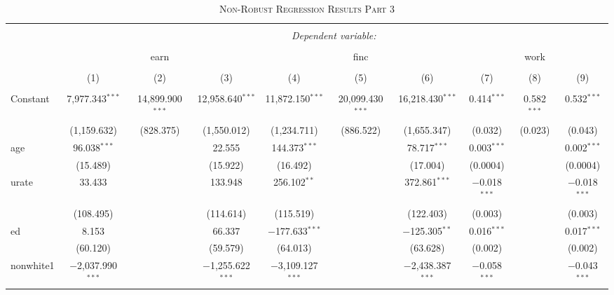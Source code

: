 \documentclass[a4paper]{article}
\begin{document}
\begin{landscape}
\begin{table}[!htbp] \centering 
\begin{adjustwidth}{1.25cm}{-0cm}
\begin{threeparttable}
\small
\captionsetup{font=small, justification=raggedright,singlelinecheck=false}
\caption{\textsc{Non-Robust Regression Results Part 3}}
\centering 
  \label{}
\small 
\begin{tabular}{@{\extracolsep{-2pt}}lccccccccc} 
\\[-5.8ex]\hline 
\hline \\[-1.8ex] 
 & \multicolumn{9}{c}{\textit{Dependent variable:}} \\ 
\cline{2-10} 
\\[-1.8ex] & \multicolumn{3}{c}{earn} & \multicolumn{3}{c}{finc} & \multicolumn{3}{c}{work} \\ 
\\[-1.8ex] & (1) & (2) & (3) & (4) & (5) & (6) & (7) & (8) & (9)\\ 
\hline \\[-1.8ex] 
 Constant & 7,977.343$^{***}$ & 14,899.900$^{***}$ & 12,958.640$^{***}$ & 11,872.150$^{***}$ & 20,099.430$^{***}$ & 16,218.430$^{***}$ & 0.414$^{***}$ & 0.582$^{***}$ & 0.532$^{***}$ \\ 
  & (1,159.632) & (828.375) & (1,550.012) & (1,234.711) & (886.522) & (1,655.347) & (0.032) & (0.023) & (0.043) \\ 
  age & 96.038$^{***}$ &  & 22.555 & 144.373$^{***}$ &  & 78.717$^{***}$ & 0.003$^{***}$ &  & 0.002$^{***}$ \\ 
  & (15.489) &  & (15.922) & (16.492) &  & (17.004) & (0.0004) &  & (0.0004) \\ 
  urate & 33.433 &  & 133.948 & 256.102$^{**}$ &  & 372.861$^{***}$ & $-$0.018$^{***}$ &  & $-$0.018$^{***}$ \\ 
  & (108.495) &  & (114.614) & (115.519) &  & (122.403) & (0.003) &  & (0.003) \\ 
  ed & 8.153 &  & 66.337 & $-$177.633$^{***}$ &  & $-$125.305$^{**}$ & 0.016$^{***}$ &  & 0.017$^{***}$ \\ 
  & (60.120) &  & (59.579) & (64.013) &  & (63.628) & (0.002) &  & (0.002) \\ 
  nonwhite1 & $-$2,037.990$^{***}$ &  & $-$1,255.622$^{***}$ & $-$3,109.127$^{***}$ &  & $-$2,438.387$^{***}$ & $-$0.058$^{***}$ &  & $-$0.043$^{***}$ \\ 

\end{tabular}
\end{threeparttable}
\end{adjustwidth}
\end{table}
\end{landscape}
\end{document}
